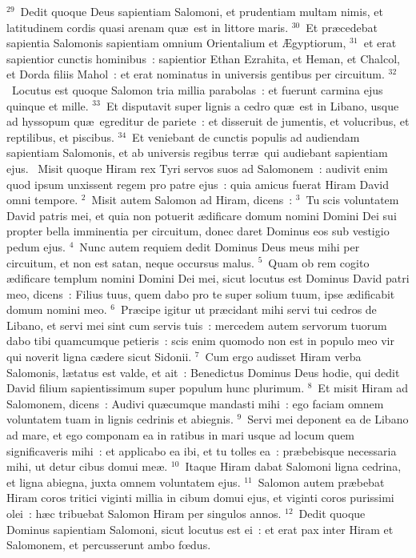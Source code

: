 ${}^{29}$~Dedit quoque Deus sapientiam Salomoni, et prudentiam multam nimis, et latitudinem cordis quasi arenam qu\ae\ est in littore maris.
${}^{30}$~Et pr\ae cedebat sapientia Salomonis sapientiam omnium Orientalium et \AE gyptiorum,
${}^{31}$~et erat sapientior cunctis hominibus~: sapientior Ethan Ezrahita, et Heman, et Chalcol, et Dorda filiis Mahol~: et erat nominatus in universis gentibus per circuitum.
${}^{32}$~Locutus est quoque Salomon tria millia parabolas~: et fuerunt carmina ejus quinque et mille.
${}^{33}$~Et disputavit super lignis a cedro qu\ae\ est in Libano, usque ad hyssopum qu\ae\ egreditur de pariete~: et disseruit de jumentis, et volucribus, et reptilibus, et piscibus.
${}^{34}$~Et veniebant de cunctis populis ad audiendam sapientiam Salomonis, et ab universis regibus terr\ae\ qui audiebant sapientiam ejus.
~Misit quoque Hiram rex Tyri servos suos ad Salomonem~: audivit enim quod ipsum unxissent regem pro patre ejus~: quia amicus fuerat Hiram David omni tempore.
${}^{2}$~Misit autem Salomon ad Hiram, dicens~:
${}^{3}$~Tu scis voluntatem David patris mei, et quia non potuerit \ae dificare domum nomini Domini Dei sui propter bella imminentia per circuitum, donec daret Dominus eos sub vestigio pedum ejus.
${}^{4}$~Nunc autem requiem dedit Dominus Deus meus mihi per circuitum, et non est satan, neque occursus malus.
${}^{5}$~Quam ob rem cogito \ae dificare templum nomini Domini Dei mei, sicut locutus est Dominus David patri meo, dicens~: Filius tuus, quem dabo pro te super solium tuum, ipse \ae dificabit domum nomini meo.
${}^{6}$~Pr\ae cipe igitur ut pr\ae cidant mihi servi tui cedros de Libano, et servi mei sint cum servis tuis~: mercedem autem servorum tuorum dabo tibi quamcumque petieris~: scis enim quomodo non est in populo meo vir qui noverit ligna c\ae dere sicut Sidonii.
${}^{7}$~Cum ergo audisset Hiram verba Salomonis, l\ae tatus est valde, et ait~: Benedictus Dominus Deus hodie, qui dedit David filium sapientissimum super populum hunc plurimum.
${}^{8}$~Et misit Hiram ad Salomonem, dicens~: Audivi qu\ae cumque mandasti mihi~: ego faciam omnem voluntatem tuam in lignis cedrinis et abiegnis.
${}^{9}$~Servi mei deponent ea de Libano ad mare, et ego componam ea in ratibus in mari usque ad locum quem significaveris mihi~: et applicabo ea ibi, et tu tolles ea~: pr\ae bebisque necessaria mihi, ut detur cibus domui me\ae .
${}^{10}$~Itaque Hiram dabat Salomoni ligna cedrina, et ligna abiegna, juxta omnem voluntatem ejus.
${}^{11}$~Salomon autem pr\ae bebat Hiram coros tritici viginti millia in cibum domui ejus, et viginti coros purissimi olei~: h\ae c tribuebat Salomon Hiram per singulos annos.
${}^{12}$~Dedit quoque Dominus sapientiam Salomoni, sicut locutus est ei~: et erat pax inter Hiram et Salomonem, et percusserunt ambo fœdus.


